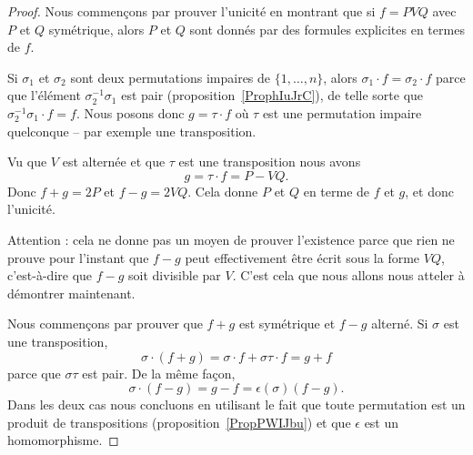 \begin{proof}

    Nous commençons par prouver l'unicité en montrant que si \( f=PVQ\) avec \( P\) et \( Q\) symétrique, alors \( P\) et \( Q\) sont donnés par des formules explicites en termes de \( f\).


    Si \( \sigma_1\) et \( \sigma_2\) sont deux permutations impaires de \( \{ 1,\ldots, n \}\), alors \( \sigma_1\cdot f=\sigma_2\cdot f\) parce que l'élément \( \sigma_2^{-1}\sigma_1\) est pair (proposition~\ref{ProphIuJrC}), de telle sorte que \( \sigma_2^{-1}\sigma_1\cdot f=f\). Nous posons donc \( g=\tau\cdot f\) où \( \tau\) est une permutation impaire quelconque -- par exemple une transposition.

    Vu que \( V\) est alternée et que \( \tau\) est une transposition nous avons
    \begin{equation}
        g=\tau\cdot f=P-VQ.
    \end{equation}
    Donc \( f+g=2P\) et \( f-g=2VQ\). Cela donne \( P\) et \( Q\) en terme de \( f\) et \( g\), et donc l'unicité.

    Attention : cela ne donne pas un moyen de prouver l'existence parce que rien ne prouve pour l'instant que \( f-g\) peut effectivement être écrit sous la forme \( VQ\), c'est-à-dire que \( f-g\) soit divisible par \( V\). C'est cela que nous allons nous atteler à démontrer maintenant.

    Nous commençons par prouver que \( f+g\) est symétrique et \( f-g\) alterné. Si \( \sigma\) est une transposition,
    \begin{equation}
        \sigma\cdot(f+g)=\sigma\cdot f+\sigma\tau\cdot f=g+f
    \end{equation}
    parce que \( \sigma\tau\) est pair. De la même façon,
    \begin{equation}
        \sigma\cdot(f-g)=g-f=\epsilon(\sigma)(f-g).
    \end{equation}
    Dans les deux cas nous concluons en utilisant le fait que toute permutation est un produit de transpositions (proposition~\ref{PropPWIJbu}) et que \( \epsilon\) est un homomorphisme.


\end{proof}
